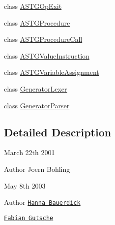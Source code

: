 \begin{DoxyCompactItemize}
\item 
class \hyperlink{classorg_1_1tzi_1_1use_1_1parser_1_1generator_1_1_a_s_t_g_op_exit}{A\-S\-T\-G\-Op\-Exit}
\item 
class \hyperlink{classorg_1_1tzi_1_1use_1_1parser_1_1generator_1_1_a_s_t_g_procedure}{A\-S\-T\-G\-Procedure}
\item 
class \hyperlink{classorg_1_1tzi_1_1use_1_1parser_1_1generator_1_1_a_s_t_g_procedure_call}{A\-S\-T\-G\-Procedure\-Call}
\item 
class \hyperlink{classorg_1_1tzi_1_1use_1_1parser_1_1generator_1_1_a_s_t_g_value_instruction}{A\-S\-T\-G\-Value\-Instruction}
\item 
class \hyperlink{classorg_1_1tzi_1_1use_1_1parser_1_1generator_1_1_a_s_t_g_variable_assignment}{A\-S\-T\-G\-Variable\-Assignment}
\item 
class \hyperlink{classorg_1_1tzi_1_1use_1_1parser_1_1generator_1_1_generator_lexer}{Generator\-Lexer}
\item 
class \hyperlink{classorg_1_1tzi_1_1use_1_1parser_1_1generator_1_1_generator_parser}{Generator\-Parser}
\end{DoxyCompactItemize}


\subsection{Detailed Description}
March 22th 2001 \begin{DoxyAuthor}{Author}
Joern Bohling
\end{DoxyAuthor}
May 8th 2003 \begin{DoxyAuthor}{Author}
\href{mailto:hanna@tzi.de}{\tt Hanna Bauerdick} 

\href{mailto:gutsche@tzi.de}{\tt Fabian Gutsche} 
\end{DoxyAuthor}
